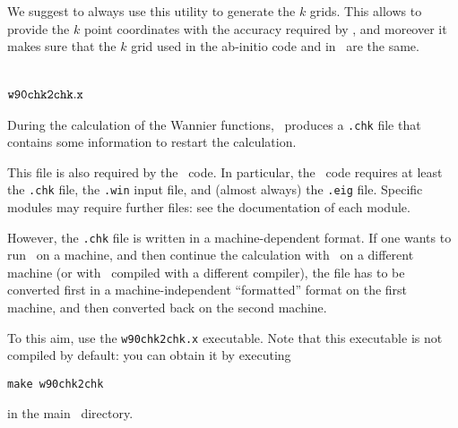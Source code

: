 We suggest to always use this utility to generate the $k$ grids. This
allows to
provide the $k$ point coordinates with the accuracy required by
\wannier, and moreover it
makes sure that the $k$ grid used in the ab-initio code and in
\wannier\ are the same.

\section{$\tt{w90chk2chk.x}$\label{sec:w90chk2chk}}
During the calculation of the Wannier functions, \wannier\ produces a
\verb|.chk| file that contains some information to restart the
calculation.

This file is also required by the \postw\ code.
In particular, the \postw\ code requires at least the \verb|.chk| file, the
\verb|.win| input file, and (almost always) the \verb|.eig|
file. Specific modules may require further files: see the
documentation of each module.

However, the \verb|.chk| file is
written in a machine-dependent format. If one wants to run \wannier\
on a machine, and then continue the calculation with \postw\ on a
different machine (or with \postw\ compiled with a different compiler), the file has to be
converted first in a machine-independent ``formatted'' format on the
first machine, and
then converted back on the second machine.

To this aim, use the \verb|w90chk2chk.x| executable. Note that this
executable is not compiled by default: you can obtain it by executing
\begin{verbatim}
make w90chk2chk
\end{verbatim}
in the main \wannier\ directory.

